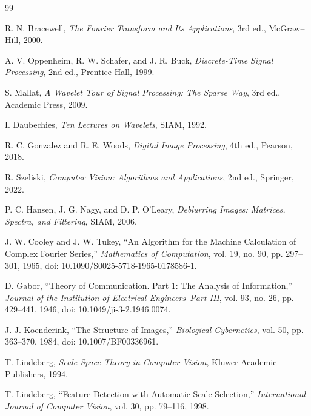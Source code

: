 \documentclass[12pt,openany,oneside]{book}
\begin{document}
\backmatter
\renewcommand{\bibname}{منابع علمی، کتاب‌ها، استانداردها و مقالات فصل سوم}
\begin{thebibliography}{99}
\begin{LTR}

R. N. Bracewell,
\emph{The Fourier Transform and Its Applications}, 3rd ed., McGraw--Hill, 2000.

A. V. Oppenheim, R. W. Schafer, and J. R. Buck,
\emph{Discrete-Time Signal Processing}, 2nd ed., Prentice Hall, 1999.

S. Mallat,
\emph{A Wavelet Tour of Signal Processing: The Sparse Way}, 3rd ed., Academic Press, 2009.

I. Daubechies,
\emph{Ten Lectures on Wavelets}, SIAM, 1992.

R. C. Gonzalez and R. E. Woods,
\emph{Digital Image Processing}, 4th ed., Pearson, 2018.

R. Szeliski,
\emph{Computer Vision: Algorithms and Applications}, 2nd ed., Springer, 2022.

P. C. Hansen, J. G. Nagy, and D. P. O'Leary,
\emph{Deblurring Images: Matrices, Spectra, and Filtering}, SIAM, 2006.

J. W. Cooley and J. W. Tukey,
``An Algorithm for the Machine Calculation of Complex Fourier Series,''
\emph{Mathematics of Computation}, vol. 19, no. 90, pp. 297--301, 1965,
doi: 10.1090/S0025-5718-1965-0178586-1.

D. Gabor,
``Theory of Communication. Part 1: The Analysis of Information,''
\emph{Journal of the Institution of Electrical Engineers--Part III}, vol. 93, no. 26,
pp. 429--441, 1946, doi: 10.1049/ji-3-2.1946.0074.

J. J. Koenderink,
``The Structure of Images,''
\emph{Biological Cybernetics}, vol. 50, pp. 363--370, 1984,
doi: 10.1007/BF00336961.

T. Lindeberg,
\emph{Scale-Space Theory in Computer Vision}, Kluwer Academic Publishers, 1994.

T. Lindeberg,
``Feature Detection with Automatic Scale Selection,''
\emph{International Journal of Computer Vision}, vol. 30, pp. 79--116, 1998.


\end{LTR}
\end{thebibliography}
\end{document}
